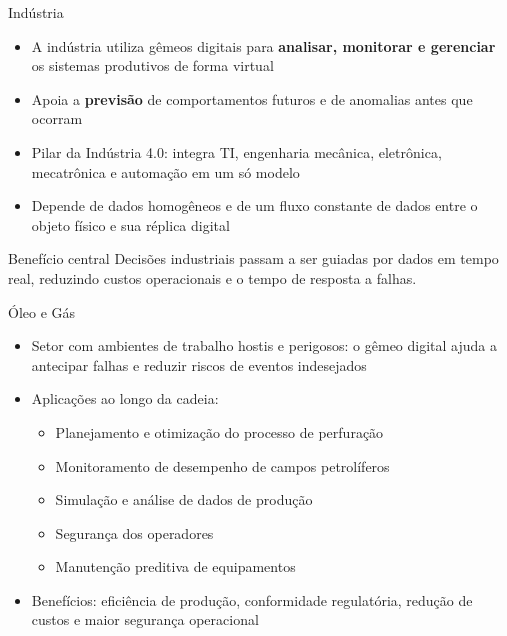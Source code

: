 \documentclass[aspectratio=169,xcolor=dvipsnames]{beamer}
\begin{document}
\begin{frame}{Indústria}
    \begin{itemize}
        \item A indústria utiliza gêmeos digitais para \textbf{analisar, monitorar e gerenciar} os sistemas produtivos de forma virtual
        \item Apoia a \textbf{previsão} de comportamentos futuros e de anomalias antes que ocorram
        \item Pilar da Indústria 4.0: integra TI, engenharia mecânica, eletrônica, mecatrônica e automação em um só modelo
        \item Depende de dados homogêneos e de um fluxo constante de dados entre o objeto físico e sua réplica digital
    \end{itemize}
    \begin{exampleblock}{Benefício central}
        Decisões industriais passam a ser guiadas por dados em tempo real, reduzindo custos operacionais e o tempo de resposta a falhas.
    \end{exampleblock}
\end{frame}

\begin{frame}{Óleo e Gás}
    \begin{itemize}
        \item Setor com ambientes de trabalho hostis e perigosos: o gêmeo digital ajuda a antecipar falhas e reduzir riscos de eventos indesejados
        \item Aplicações ao longo da cadeia:
        \begin{itemize}
            \item Planejamento e otimização do processo de perfuração
            \item Monitoramento de desempenho de campos petrolíferos
            \item Simulação e análise de dados de produção
            \item Segurança dos operadores 
            \item Manutenção preditiva de equipamentos
        \end{itemize}
        \item Benefícios: eficiência de produção, conformidade regulatória, redução de custos e maior segurança operacional
    \end{itemize}
\end{frame}
\end{document}

